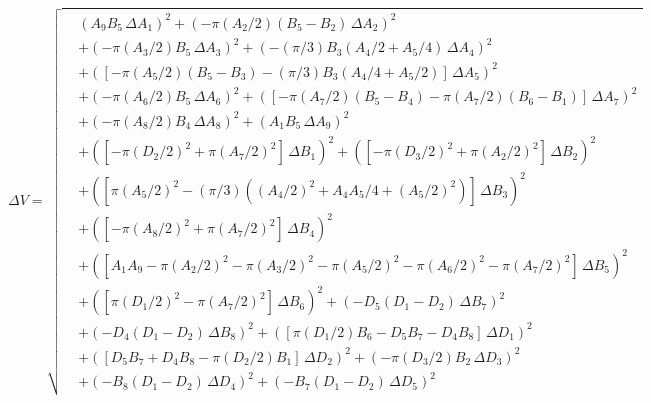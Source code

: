 \begin{equation}
\Delta V = \sqrt{
\begin{aligned}
  &(A_9 B_5\,\Delta A_1)^2
   + (-\pi (A_2/2)(B_5-B_2)\,\Delta A_2)^2 \\
  &+ (-\pi (A_3/2) B_5\,\Delta A_3)^2
   + (-(\pi/3) B_3 (A_4/2 + A_5/4)\,\Delta A_4)^2 \\
  &+ ([-\pi (A_5/2)(B_5-B_3) - (\pi/3) B_3 (A_4/4 + A_5/2)]\,\Delta A_5)^2 \\
  &+ (-\pi (A_6/2) B_5\,\Delta A_6)^2
   + ([-\pi (A_7/2)(B_5-B_4) - \pi (A_7/2)(B_6-B_1)]\,\Delta A_7)^2 \\
  &+ (-\pi (A_8/2) B_4\,\Delta A_8)^2
   + (A_1 B_5\,\Delta A_9)^2 \\
  &+ ([-\pi (D_2/2)^2 + \pi (A_7/2)^2]\,\Delta B_1)^2
   + ([-\pi (D_3/2)^2 + \pi (A_2/2)^2]\,\Delta B_2)^2 \\
  &+ ([\pi (A_5/2)^2 - (\pi/3)((A_4/2)^2 + A_4 A_5/4 + (A_5/2)^2)]\,\Delta B_3)^2 \\
  &+ ([-\pi (A_8/2)^2 + \pi (A_7/2)^2]\,\Delta B_4)^2 \\
  &+ ([A_1 A_9 - \pi (A_2/2)^2 - \pi (A_3/2)^2 - \pi (A_5/2)^2
       - \pi (A_6/2)^2 - \pi (A_7/2)^2]\,\Delta B_5)^2 \\
  &+ ([\pi (D_1/2)^2 - \pi (A_7/2)^2]\,\Delta B_6)^2
   + (-D_5 (D_1-D_2)\,\Delta B_7)^2 \\
  &+ (-D_4 (D_1-D_2)\,\Delta B_8)^2
   + ([\pi (D_1/2) B_6 - D_5 B_7 - D_4 B_8]\,\Delta D_1)^2 \\
  &+ ([D_5 B_7 + D_4 B_8 - \pi (D_2/2) B_1]\,\Delta D_2)^2
   + (-\pi (D_3/2) B_2\,\Delta D_3)^2 \\
  &+ (-B_8 (D_1-D_2)\,\Delta D_4)^2
   + (-B_7 (D_1-D_2)\,\Delta D_5)^2
\end{aligned}
}
\end{equation}

